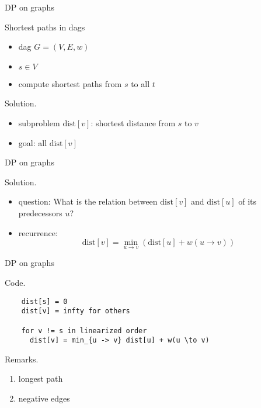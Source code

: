 \begin{frame}{DP on graphs}
  \begin{exampleblock}{Shortest paths in dags}
    \begin{itemize}
      \item dag $G = (V, E, w)$
      \item $s \in V$
      \item compute shortest paths from $s$ to all $t$
    \end{itemize}

  \end{exampleblock}

  \begin{block}{Solution.}
    \begin{itemize}
      \item subproblem $\text{dist}[v]$: shortest distance from $s$ to $v$ 
      \item goal: all $\text{dist}[v]$
    \end{itemize}
  \end{block}
\end{frame}
\begin{frame}{DP on graphs}
  \begin{block}{Solution.}
    \begin{itemize}
      \item question: What is the relation between $\text{dist}[v]$ and $\text{dist}[u]$ of its predecessors $u$?
      \item recurrence:
	\[
	  \text{dist}[v] = \min_{u \to v} \left(\text{dist}[u] + w(u \to v)\right) 
	\]
    \end{itemize}
  \end{block}
\end{frame}
\begin{frame}[fragile]{DP on graphs}
  \begin{block}{Code.}
    \begin{verbatim}
    dist[s] = 0
    dist[v] = infty for others

    for v != s in linearized order
      dist[v] = min_{u -> v} dist[u] + w(u \to v)
    \end{verbatim}
  \end{block}

  \begin{alertblock}{Remarks.}
    \begin{enumerate}
      \item longest path
      \item negative edges
    \end{enumerate}
  \end{alertblock}
\end{frame}
